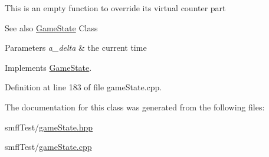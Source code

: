 This is an empty function to override it\textquotesingle{}s virtual counter part \begin{DoxySeeAlso}{See also}
\hyperlink{class_game_state}{Game\+State} Class 
\end{DoxySeeAlso}

\begin{DoxyParams}{Parameters}
{\em a\+\_\+delta} & the current time \\
\hline
\end{DoxyParams}


Implements \hyperlink{class_game_state_ab1fe4312f7ce88e7dc11f9935dee67d1}{Game\+State}.



Definition at line 183 of file game\+State.\+cpp.



The documentation for this class was generated from the following files\+:\begin{DoxyCompactItemize}
\item 
smfl\+Test/\hyperlink{game_state_8hpp}{game\+State.\+hpp}\item 
smfl\+Test/\hyperlink{game_state_8cpp}{game\+State.\+cpp}\end{DoxyCompactItemize}
